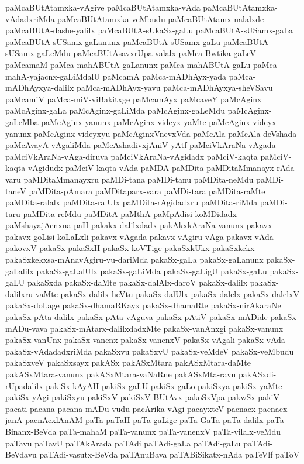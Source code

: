 {paMcaBUtAtamxka-vAgive
paMcaBUtAtamxka-vAda
paMcaBUtAtamxka-vAdadxriMda
paMcaBUtAtamxka-veMbudu
paMcaBUtAtamx-nalalxde
paMcaBUtA-dashe-yalilx
paMcaBUtA-sUkaSx-gaLu
paMcaBUtA-sUSamx-gaLa
paMcaBUtA-sUSamx-gaLanunx
paMcaBUtA-sUSamx-gaLu
paMcaBUtA-sUSamx-gaLeMdu
paMcaBUtAsavxrUpa-valalx
paMca-Bwtika-gaLeV
paMcamaM
paMca-mahABUtA-gaLanunx
paMca-mahABUtA-gaLu
paMca-mahA-yajacnx-gaLiMdalU
paMcamA
paMca-mADhAyx-yada
paMca-mADhAyxya-dalilx
paMca-mADhAyx-yavu
paMca-mADhAyxya-sheVSavu
paMcamiV
paMca-miV-viBakitxge
paMcamAyx
paMcaveY
paMcAginx
paMcAginx-gaLa
paMcAginx-gaLiMda
paMcAginx-gaLeMdu
paMcAginx-gaLeMba
paMcAginx-yanunx
paMcAginx-videyx-yaMte
paMcAginx-videyx-yanunx
paMcAginx-videyxyu
paMcAginxVnevxVda
paMcAla
paMcAla-deVshada
paMcAvayA-vAgaliMda
paMcAshadivxjAniV-yAtf
paMciVkAraNa-vAgada
paMciVkAraNa-vAga-diruva
paMciVkAraNa-vAgidadx
paMciV-kaqta
paMciV-kaqta-vAgidudx
paMciV-kaqta-vAda
paMDA
paMDita
paMDitaMmanayx-rAda-varu
paMDitaMmanayxru
paMDi-tana
paMDi-tanu
paMDita-neMdu
paMDi-taneV
paMDita-pAmara
paMDitaparx-vara
paMDi-tara
paMDita-raMte
paMDita-ralalx
paMDita-ralUlx
paMDita-rAgidadxru
paMDita-riMda
paMDi-taru
paMDita-reMdu
paMDitA
paMthA
paMpAdisi-koMDidadx
paMshayajAcnxna
paH
pakakx-dalilxdadx
pakAkxkAraNa-vanunx
pakavx
pakavx-goLisi-koLaLxli
pakavx-vAgada
pakavx-vAgiru-vAga
pakavx-vAda
pakovxV
pakaSx
pakaSxH
pakaSx-koVTige
pakaSxkUkx
pakaSxkekx
pakaSxkekxsa-mAnavAgiru-vu-dariMda
pakaSx-gaLa
pakaSx-gaLanunx
pakaSx-gaLalilx
pakaSx-gaLalUlx
pakaSx-gaLiMda
pakaSx-gaLigU
pakaSx-gaLu
pakaSx-gaLU
pakaSxda
pakaSx-daMte
pakaSx-dalAlx-daroV
pakaSx-dalilx
pakaSx-dalilxru-vaMte
pakaSx-dalilx-heVtu
pakaSx-dalUlx
pakaSx-dalelx
pakaSx-dalelxV
pakaSx-doLage
pakaSx-dhamaRKayx
pakaSx-dhamaRte
pakaSx-nirAkaraNe
pakaSx-pAta-dalilx
pakaSx-pAta-vAguva
pakaSx-pAtiV
pakaSx-mADide
pakaSx-mADu-vava
pakaSx-mAtarx-dalilxdadxMte
pakaSx-vanAnxgi
pakaSx-vanunx
pakaSx-vanUnx
pakaSx-vanenx
pakaSx-vanenxV
pakaSx-vAgali
pakaSx-vAda
pakaSx-vAdadadxriMda
pakaSxvu
pakaSxvU
pakaSx-veMdeV
pakaSx-veMbudu
pakaSxveV
pakaSxsayx
pakASx
pakASxMtara
pakASxMtara-daMte
pakASxMtara-vanunx
pakASxMtara-vaNaRne
pakASxMta-ravu
pakASxdi-rUpadalilx
pakiSx-kAyAH
pakiSx-gaLU
pakiSx-gaLo
pakiSxya
pakiSx-yaMte
pakiSx-yAgi
pakiSxyu
pakiSxV
pakiSxV-BUtAvx
pakoSxVpa
pakwSx
pakiV
pacati
pacana
pacana-mADu-vudu
pacArika-vAgi
pacayxteV
pacnacx
pacnacx-janA
pacnAcxlAnAM
paTa
paTaH
paTa-gaLige
paTa-GaTa
paTa-dalilx
paTa-Binanx-BeVda
paTa-mahaM
paTa-vanunx
paTa-vanenxV
paTa-vilalx-veMdu
paTavu
paTavU
paTAkArada
paTAdi
paTAdi-gaLa
paTAdi-gaLu
paTAdi-BeVdavu
paTAdi-vasutx-BeVda
paTAnuBava
paTABiSikatx-nAda
paTeVlf
paToV
}
